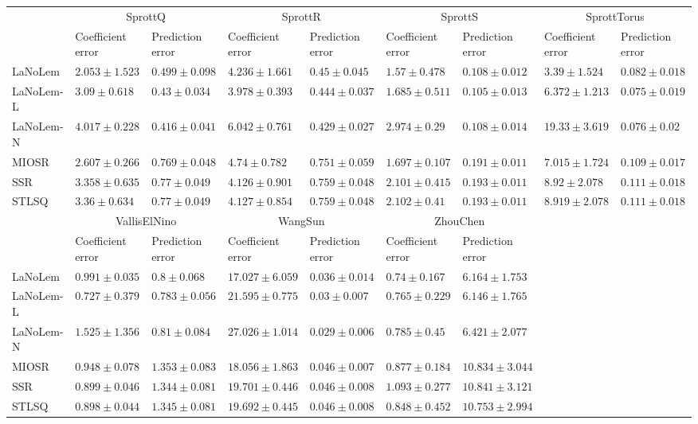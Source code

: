 \begin{table*}
{\begin{tabular}{lllllllll}
 & \multicolumn{2}{c}{SprottQ} & \multicolumn{2}{c}{SprottR} & \multicolumn{2}{c}{SprottS} & \multicolumn{2}{c}{SprottTorus} \\
 & Coefficient error & Prediction error & Coefficient error & Prediction error & Coefficient error & Prediction error & Coefficient error & Prediction error \\
\midrule
LaNoLem & $\mathbf{2.053}\pm 1.523$ & $0.499\pm 0.098$ & $4.236\pm 1.661$ & $0.45\pm 0.045$ & $\mathbf{1.57}\pm 0.478$ & $0.108\pm 0.012$ & $\mathbf{3.39}\pm 1.524$ & $0.082\pm 0.018$ \\
LaNoLem-L & $3.09\pm 0.618$ & $0.43\pm 0.034$ & $\mathbf{3.978}\pm 0.393$ & $0.444\pm 0.037$ & $1.685\pm 0.511$ & $\mathbf{0.105}\pm 0.013$ & $6.372\pm 1.213$ & $\mathbf{0.075}\pm 0.019$ \\
LaNoLem-N & $4.017\pm 0.228$ & $\mathbf{0.416}\pm 0.041$ & $6.042\pm 0.761$ & $\mathbf{0.429}\pm 0.027$ & $2.974\pm 0.29$ & $0.108\pm 0.014$ & $19.33\pm 3.619$ & $0.076\pm 0.02$ \\
MIOSR & $2.607\pm 0.266$ & $0.769\pm 0.048$ & $4.74\pm 0.782$ & $0.751\pm 0.059$ & $1.697\pm 0.107$ & $0.191\pm 0.011$ & $7.015\pm 1.724$ & $0.109\pm 0.017$ \\
SSR & $3.358\pm 0.635$ & $0.77\pm 0.049$ & $4.126\pm 0.901$ & $0.759\pm 0.048$ & $2.101\pm 0.415$ & $0.193\pm 0.011$ & $8.92\pm 2.078$ & $0.111\pm 0.018$ \\
STLSQ & $3.36\pm 0.634$ & $0.77\pm 0.049$ & $4.127\pm 0.854$ & $0.759\pm 0.048$ & $2.102\pm 0.41$ & $0.193\pm 0.011$ & $8.919\pm 2.078$ & $0.111\pm 0.018$ \\

\midrule

 & \multicolumn{2}{c}{VallisElNino} & \multicolumn{2}{c}{WangSun} & \multicolumn{2}{c}{ZhouChen} \\
 & Coefficient error & Prediction error & Coefficient error & Prediction error & Coefficient error & Prediction error \\
\midrule
LaNoLem & $0.991\pm 0.035$ & $0.8\pm 0.068$ & $\mathbf{17.027}\pm 6.059$ & $0.036\pm 0.014$ & $\mathbf{0.74}\pm 0.167$ & $6.164\pm 1.753$ \\
LaNoLem-L & $\mathbf{0.727}\pm 0.379$ & $\mathbf{0.783}\pm 0.056$ & $21.595\pm 0.775$ & $0.03\pm 0.007$ & $0.765\pm 0.229$ & $\mathbf{6.146}\pm 1.765$ \\
LaNoLem-N & $1.525\pm 1.356$ & $0.81\pm 0.084$ & $27.026\pm 1.014$ & $\mathbf{0.029}\pm 0.006$ & $0.785\pm 0.45$ & $6.421\pm 2.077$ \\
MIOSR & $0.948\pm 0.078$ & $1.353\pm 0.083$ & $18.056\pm 1.863$ & $0.046\pm 0.007$ & $0.877\pm 0.184$ & $10.834\pm 3.044$ \\
SSR & $0.899\pm 0.046$ & $1.344\pm 0.081$ & $19.701\pm 0.446$ & $0.046\pm 0.008$ & $1.093\pm 0.277$ & $10.841\pm 3.121$ \\
STLSQ & $0.898\pm 0.044$ & $1.345\pm 0.081$ & $19.692\pm 0.445$ & $0.046\pm 0.008$ & $0.848\pm 0.452$ & $10.753\pm 2.994$ \\

\bottomrule
\end{tabular}
}
\end{table*}
